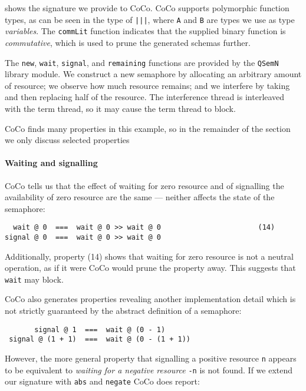  shows the signature we provide to CoCo.  CoCo supports
polymorphic function types, as can be seen in the type of \verb#|||#,
where \verb|A| and \verb|B| are types we use as type \emph{variables}.
The \verb|commLit| function indicates that the supplied binary
function is \emph{commutative}, which is used to prune the generated
schemas further.

The \verb|new|, \verb|wait|, \verb|signal|, and \verb|remaining|
functions are provided by the \verb|QSemN| library module.  We
construct a new semaphore by allocating an arbitrary amount of
resource; we observe how much resource remains; and we interfere by
taking and then replacing half of the resource.  The interference
thread is interleaved with the term thread, so it may cause the term
thread to block.

CoCo finds many properties in this example, so in the remainder of the
section we only discuss selected properties

\paragraph{Waiting and signalling}
CoCo tells us that the effect of waiting for zero resource and of
signalling the availability of zero resource are the same --- neither
affects the state of the semaphore:

\begin{verbatim}
  wait @ 0  ===  wait @ 0 >> wait @ 0                       (14)
signal @ 0  ===  wait @ 0 >> wait @ 0
\end{verbatim}

\noindent
Additionally, property (14) shows that waiting for zero resource is
not a neutral operation, as if it were CoCo would prune the property
away.  This suggests that \verb|wait| may block.

CoCo also generates properties revealing another implementation detail
which is not strictly guaranteed by the abstract definition of a
semaphore:

\begin{verbatim}
       signal @ 1  ===  wait @ (0 - 1)
 signal @ (1 + 1)  ===  wait @ (0 - (1 + 1))
\end{verbatim}

\noindent
However, the more general property that signalling a positive resource
\verb|n| appears to be equivalent to \emph{waiting for a negative
  resource} \verb|-n| is not found.  If we extend our signature with
\verb|abs| and \verb|negate| CoCo does report:


